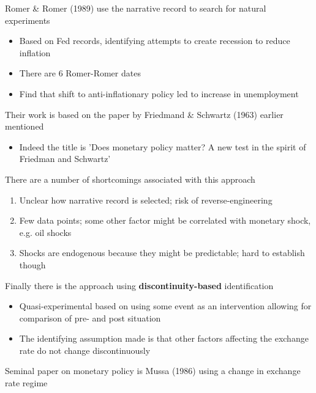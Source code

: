 \documentclass{beamer}
\begin{document}
\begin{frame}
  Romer \& Romer (1989) use the narrative record to search for natural experiments
  \begin{itemize}
    \item Based on Fed records, identifying attempts to create recession to reduce inflation
    \item There are 6 Romer-Romer dates
    \item Find that shift to anti-inflationary policy led to increase in unemployment
  \end{itemize}
  \medskip
  Their work is based on the paper by Friedmand \& Schwartz (1963) earlier mentioned
  \begin{itemize}
    \item Indeed the title is 'Does monetary policy matter? A new test in the spirit of Friedman and Schwartz'
  \end{itemize}    
\end{frame}

\begin{frame}
  There are a number of shortcomings associated with this approach  
  \begin{enumerate}
    \item Unclear how narrative record is selected; risk of reverse-engineering 
    \item Few data points; some other factor might be correlated with monetary shock, e.g. oil shocks
    \item Shocks are endogenous because they might be predictable; hard to establish though
  \end{enumerate}
\end{frame}

\begin{frame}
  Finally there is the approach using \textbf{discontinuity-based} identification
  \medskip
  \begin{itemize}
    \item Quasi-experimental based on using some event as an intervention allowing for comparison of pre- and post situation 
    \item The identifying assumption made is that other factors affecting the exchange rate do not change discontinuously
  \end{itemize}
  \medskip
  Seminal paper on monetary policy is Mussa (1986) using a change in exchange rate regime
\end{frame}
\end{document}
